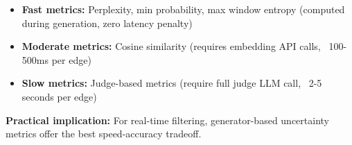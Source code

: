 \begin{itemize}
    \item \textbf{Fast metrics:} Perplexity, min probability, max window entropy (computed during generation, zero latency penalty)
    \item \textbf{Moderate metrics:} Cosine similarity (requires embedding API calls, ~100-500ms per edge)
    \item \textbf{Slow metrics:} Judge-based metrics (require full judge LLM call, ~2-5 seconds per edge)
\end{itemize}

\textbf{Practical implication:} For real-time filtering, generator-based uncertainty metrics offer the best speed-accuracy tradeoff.



